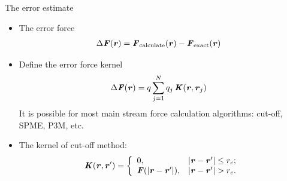 \documentclass{beamer}
\newcommand{\bluec}[1]{{\color{blue} #1}}
\renewcommand{\v}[1]{\textbf{\textit{#1}}}
\begin{document}
\begin{frame}{The error estimate}
  \begin{itemize}
  \item <1-> The error force
    \bluec{
      \begin{align*}
        \Delta \v F(\v r)
        &=
        \v F_{\textrm{calculate}}(\v r) - \v F_{\textrm{exact}}(\v r)
      \end{align*}}
  \item <2-> Define the error force kernel
    \bluec{
      \begin{align*}
        \Delta \v F(\v r)
        &=
        q \sum_{j=1}^N q_j \,\v K(\v r, \v r_j)
      \end{align*}}
    It is possible for most main stream force calculation algorithms: cut-off, SPME, P3M, etc.
  \item <3-> The kernel of cut-off method:
    \bluec{
      \begin{align*}
        \v K(\v r,\v r') =
        \left\{
          \begin{array}{ll}
            0, & \vert\v r - \v r'\vert\leq r_c; \\
            \v F(\vert\v r-\v r'\vert), & \vert\v r - \v r'\vert > r_c.
          \end{array}
        \right.
      \end{align*}}
    \vfill
  \end{itemize}
\end{frame}
\end{document}
